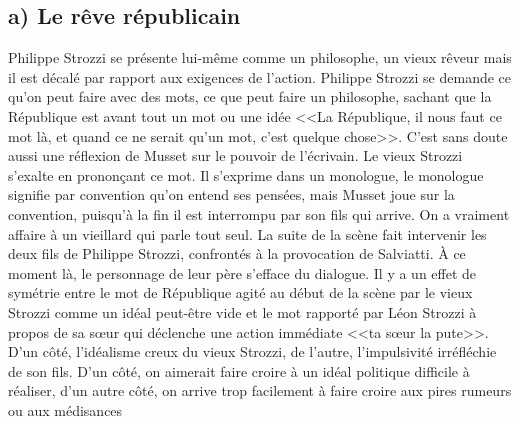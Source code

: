 \documentclass[12pt]{article}
\begin{document}
\subsection*{a) Le rêve républicain}
Philippe Strozzi se présente lui-même comme un philosophe, un vieux rêveur mais il est décalé par rapport aux exigences de l'action.
Philippe Strozzi se demande ce qu'on peut faire avec des mots, ce que peut faire un philosophe, sachant que la République est avant tout un mot ou une idée <<La République, il nous faut ce mot là, et quand ce ne serait qu'un mot, c'est quelque chose>>.
C'est sans doute aussi une réflexion de Musset sur le pouvoir de l'écrivain.
Le vieux Strozzi s'exalte en prononçant ce mot.
Il s'exprime dans un monologue, le monologue signifie par convention qu'on entend ses pensées, mais Musset joue sur la convention, puisqu'à la fin il est interrompu par son fils qui arrive.
On a vraiment affaire à un vieillard qui parle tout seul. 
La suite de la scène fait intervenir les deux fils de Philippe Strozzi, confrontés à la provocation de Salviatti. À ce moment là, le personnage de leur père s'efface du dialogue.
Il y a un effet de symétrie entre le mot de République agité au début de la scène par le vieux Strozzi comme un idéal peut-être vide et le mot rapporté par Léon Strozzi à propos de sa sœur qui déclenche une action immédiate <<ta sœur la pute>>. D'un côté, l'idéalisme creux du vieux Strozzi, de l'autre, l'impulsivité irréfléchie de son fils.
D'un côté, on aimerait faire croire à un idéal politique difficile à réaliser, d'un autre côté, on arrive trop facilement à faire croire aux pires rumeurs ou aux médisances
\end{document}
